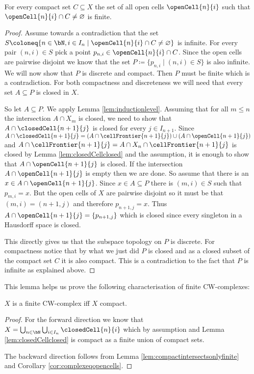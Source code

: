 \begin{lem} \label{lem:compactintersectsonlyfinite}
    For every compact set $C \subseteq X$ the set of all open cells $\openCell{n}{i}$ such that $\openCell{n}{i} \cap C \ne \varnothing$ is finite.
\end{lem}
\begin{proof}
    Assume towards a contradiction that the set $S \coloneq \{n \in \bN, i \in I_n \mid \openCell{n}{i} \cap C \ne \varnothing \}$ is infinite. 
    For every pair $(n, i) \in S$ pick a point $p_{n, i} \in \openCell{n}{i} \cap C$. 
    Since the open cells are pairwise disjoint we know that the set $P \coloneq \{p_{n, i} \mid (n, i) \in S\}$ is also infinite.
    We will now show that $P$ is discrete and compact. 
    Then $P$ must be finite which is a contradiction.
    For both compactness and discreteness we will need that every set $A \subseteq P$ is closed in $X$.

    So let $A \subseteq P$. 
    We apply Lemma \ref{lem:inductionlevel}. 
    Assuming that for all $m \le n$ the intersection $A \cap X_m$ is closed, we need to show that $A \cap \closedCell{n + 1}{j}$ is closed for every $j \in I_{n + 1}$.
    Since $A \cap \closedCell{n + 1}{j} = (A \cap \cellFrontier{n + 1}{j}) \cup (A \cap \openCell{n + 1}{j})$ and $A \cap \cellFrontier{n + 1}{j} = A \cap X_{n} \cap \cellFrontier{n + 1}{j}$ is closed by Lemma \ref{lem:closedCellclosed} and the assumption, it is enough to show that $A \cap \openCell{n + 1}{j}$ is closed. 
    If the intersection $A \cap \openCell{n + 1}{j}$ is empty then we are done. 
    So assume that there is an $x \in A \cap \openCell{n + 1}{j}$. 
    Since $x \in A \subseteq P$ there is $(m, i) \in S$ such that $p_{m, i} = x$. 
    But the open cells of $X$ are pairwise disjoint so it must be that $(m, i) = (n + 1, j)$ and therefore $p_{n + 1, j} = x$. 
    Thus $A \cap \openCell{n + 1}{j} = \{p_{n + 1, j}\}$ which is closed since every singleton in a Hausdorff space is closed. 

    This directly gives us that the subspace topology on $P$ is discrete. 
    For compactness notice that by what we just did $P$ is closed and as a closed subset of the compact set $C$ it is also compact. 
    This is a contradiction to the fact that $P$ is infinite as explained above. 
\end{proof}

This lemma helps us prove the following characterisation of finite CW-complexes: 

\begin{lem} \label{lem:finiteiffcompact}
    $X$ is a finite CW-complex iff $X$ compact.
\end{lem}
\begin{proof}
    For the forward direction we know that $X = \bigcup_{n \in \bN}\bigcup_{i \in I_n} \closedCell{n}{i}$ which by assumption and Lemma \ref{lem:closedCellclosed} is compact as a finite union of compact sets. 

    The backward direction follows from Lemma \ref{lem:compactintersectsonlyfinite} and Corollary \ref{cor:complexeqopencells}.
\end{proof}
